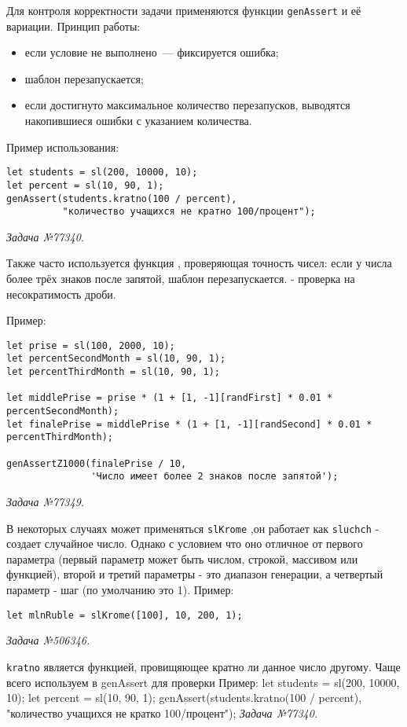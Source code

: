 Для контроля корректности задачи применяются функции \texttt{genAssert} и её вариации. Принцип работы:  
\begin{itemize}
    \item если условие не выполнено~--- фиксируется ошибка;
    \item шаблон перезапускается;
    \item если достигнуто максимальное количество перезапусков, выводятся накопившиеся ошибки с указанием количества.
\end{itemize}

Пример использования:
\begin{lstlisting}
let students = sl(200, 10000, 10);
let percent = sl(10, 90, 1); 
genAssert(students.kratno(100 / percent),
          "количество учащихся не кратно 100/процент");
\end{lstlisting}
\textsl{Задача №77340.}

Также часто используется функция , проверяющая точность чисел: если у числа более трёх знаков после запятой, шаблон перезапускается.  
 - проверка на несократимость дроби.

Пример:
\begin{lstlisting}
let prise = sl(100, 2000, 10);
let percentSecondMonth = sl(10, 90, 1);
let percentThirdMonth = sl(10, 90, 1);

let middlePrise = prise * (1 + [1, -1][randFirst] * 0.01 * percentSecondMonth);
let finalePrise = middlePrise * (1 + [1, -1][randSecond] * 0.01 * percentThirdMonth);

genAssertZ1000(finalePrise / 10,
               'Число имеет более 2 знаков после запятой');
\end{lstlisting}
\textsl{Задача №77349.}

В некоторых случаях может применяться \texttt{slKrome} ,он работает как \texttt{sluchch} - создает случайное число. Однако с условием что оно  отличное от
		первого параметра (первый параметр может быть числом, строкой, массивом или функцией),
		второй и третий параметры - это диапазон генерации, а четвертый параметр - шаг (по умолчанию это 1).
Пример:
\begin{lstlisting}
let mlnRuble = slKrome([100], 10, 200, 1);
\end{lstlisting}
\textsl{Задача №506346.}

\texttt{kratno} является функцией, провищяющее кратно ли данное число другому. Чаще всего используем в genAssert для проверки
Пример:
let students = sl(200, 10000, 10);
let percent = sl(10, 90, 1);
genAssert(students.kratno(100 / percent), "количество учащихся не кратко 100/процент");
\textsl{Задача №77340.}

